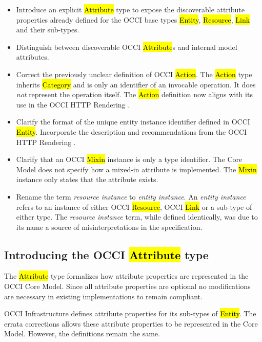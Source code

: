 \documentclass[10pt,a4paper]{article}
\begin{document}
\begin{itemize}
\item Introduce an explicit \hl{Attribute} type to expose the discoverable
  attribute properties already defined for the OCCI base types \hl{Entity},
  \hl{Resource}, \hl{Link} and their sub-types.

\item Distinguish between discoverable OCCI \hl{Attribute}s and internal model
  attributes.

\item Correct the previously unclear definition of OCCI \hl{Action}. The
  \hl{Action} type inherits \hl{Category} and is only an identifier of
  an invocable operation. It does {\em not} represent the operation itself.
  The \hl{Action} definition now aligns with its use in the OCCI HTTP Rendering
  \cite{occi:http_rendering}.

\item Clarify the format of the unique entity instance identifier defined in
  OCCI \hl{Entity}. Incorporate the description and recommendations from the
  OCCI HTTP Rendering \cite{occi:http_rendering}.

\item Clarify that an OCCI \hl{Mixin} instance is only a type identifier. The
  Core Model does not specify how a mixed-in attribute is implemented. The
  \hl{Mixin} instance only states that the attribute exists.

\item Rename the term {\em resource instance} to {\em entity instance}.
  An {\em entity instance} refers to an instance of either OCCI \hl{Resource},
  OCCI \hl{Link} or a sub-type of either type. The {\em resource instance}
  term, while defined identically, was due to its name a source of
  misinterpretations in the specification.
\end{itemize}

\subsection{Introducing the OCCI \hl{Attribute} type}

The \hl{Attribute} type formalizes how attribute properties are represented in
the OCCI Core Model. Since all attribute properties are optional no modifications
are necessary in existing implementations to remain compliant.

OCCI Infrastructure \cite{occi:infrastructure} defines attribute properties for
its sub-types of \hl{Entity}. The errata corrections allows these attribute
properties to be represented in the Core Model. However, the definitions remain the
same.
\end{document}
